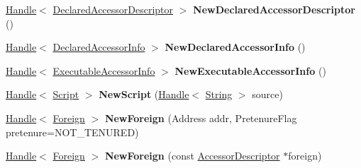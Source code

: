 \begin{DoxyCompactItemize}
\item 
\hypertarget{classv8_1_1internal_1_1_v8___f_i_n_a_l_a42d588d48c8566af7b34e93c6b875daf}{}\hyperlink{classv8_1_1internal_1_1_handle}{Handle}$<$ \hyperlink{classv8_1_1internal_1_1_declared_accessor_descriptor}{Declared\+Accessor\+Descriptor} $>$ {\bfseries New\+Declared\+Accessor\+Descriptor} ()\label{classv8_1_1internal_1_1_v8___f_i_n_a_l_a42d588d48c8566af7b34e93c6b875daf}

\item 
\hypertarget{classv8_1_1internal_1_1_v8___f_i_n_a_l_a989d8937191318bb51b0bdbadcd33928}{}\hyperlink{classv8_1_1internal_1_1_handle}{Handle}$<$ \hyperlink{classv8_1_1internal_1_1_declared_accessor_info}{Declared\+Accessor\+Info} $>$ {\bfseries New\+Declared\+Accessor\+Info} ()\label{classv8_1_1internal_1_1_v8___f_i_n_a_l_a989d8937191318bb51b0bdbadcd33928}

\item 
\hypertarget{classv8_1_1internal_1_1_v8___f_i_n_a_l_a0f494959d1ca3d258692f79ed29b06a1}{}\hyperlink{classv8_1_1internal_1_1_handle}{Handle}$<$ \hyperlink{classv8_1_1internal_1_1_executable_accessor_info}{Executable\+Accessor\+Info} $>$ {\bfseries New\+Executable\+Accessor\+Info} ()\label{classv8_1_1internal_1_1_v8___f_i_n_a_l_a0f494959d1ca3d258692f79ed29b06a1}

\item 
\hypertarget{classv8_1_1internal_1_1_v8___f_i_n_a_l_a7edf24069ed55d4275a7054102e6158f}{}\hyperlink{classv8_1_1internal_1_1_handle}{Handle}$<$ \hyperlink{classv8_1_1internal_1_1_script}{Script} $>$ {\bfseries New\+Script} (\hyperlink{classv8_1_1internal_1_1_handle}{Handle}$<$ \hyperlink{classv8_1_1internal_1_1_string}{String} $>$ source)\label{classv8_1_1internal_1_1_v8___f_i_n_a_l_a7edf24069ed55d4275a7054102e6158f}

\item 
\hypertarget{classv8_1_1internal_1_1_v8___f_i_n_a_l_a5bd5d8f85c420176b5f0d7c51fb5029d}{}\hyperlink{classv8_1_1internal_1_1_handle}{Handle}$<$ \hyperlink{classv8_1_1internal_1_1_foreign}{Foreign} $>$ {\bfseries New\+Foreign} (Address addr, Pretenure\+Flag pretenure=N\+O\+T\+\_\+\+T\+E\+N\+U\+R\+E\+D)\label{classv8_1_1internal_1_1_v8___f_i_n_a_l_a5bd5d8f85c420176b5f0d7c51fb5029d}

\item 
\hypertarget{classv8_1_1internal_1_1_v8___f_i_n_a_l_aa971ab6e5b3ed30f5717f962af779a90}{}\hyperlink{classv8_1_1internal_1_1_handle}{Handle}$<$ \hyperlink{classv8_1_1internal_1_1_foreign}{Foreign} $>$ {\bfseries New\+Foreign} (const \hyperlink{structv8_1_1internal_1_1_accessor_descriptor}{Accessor\+Descriptor} $\ast$foreign)\label{classv8_1_1internal_1_1_v8___f_i_n_a_l_aa971ab6e5b3ed30f5717f962af779a90}


\end{DoxyCompactItemize}
